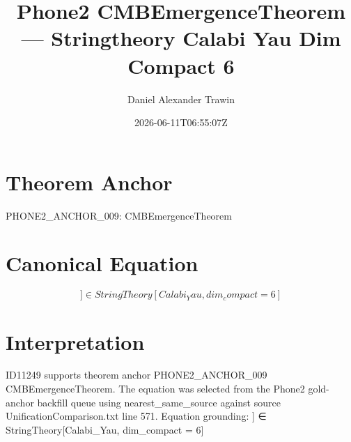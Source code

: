 \documentclass[11pt]{article}
\title{Phone2 CMBEmergenceTheorem — Stringtheory Calabi Yau Dim Compact 6}
\author{Daniel Alexander Trawin}
\date{2026-06-11T06:55:07Z}
\begin{document}
\maketitle
\section*{Theorem Anchor}
PHONE2_ANCHOR_009: CMBEmergenceTheorem
\section*{Canonical Equation}
\[
] ∈ StringTheory[Calabi_Yau, dim_compact = 6]
\]
\section*{Interpretation}
ID11249 supports theorem anchor PHONE2_ANCHOR_009 CMBEmergenceTheorem. The equation was selected from the Phone2 gold-anchor backfill queue using nearest_same_source against source UnificationComparison.txt line 571. Equation grounding: ] ∈ StringTheory[Calabi_Yau, dim_compact = 6]
\end{document}

